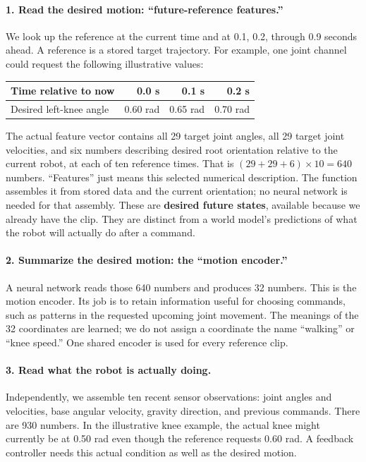 \documentclass[11pt,a4paper]{article}
\newcommand{\code}[1]{\texttt{\small\detokenize{#1}}}
\begin{document}
\paragraph{1. Read the desired motion: ``future-reference features.''}
We look up the reference at the current time and at 0.1, 0.2, through 0.9 seconds
ahead. A reference is a stored target trajectory. For example, one joint channel
could request the following illustrative values:
\begin{center}
\begin{tabular}{@{}lrrr@{}}
\toprule
Time relative to now & 0.0 s & 0.1 s & 0.2 s\\
\midrule
Desired left-knee angle & 0.60 rad & 0.65 rad & 0.70 rad\\
\bottomrule
\end{tabular}
\end{center}
The actual feature vector contains all 29 target joint angles, all 29 target
joint velocities, and six numbers describing desired root orientation relative
to the current robot, at each of ten reference times. That is
$(29+29+6)\times10=640$ numbers. ``Features'' just means this selected numerical
description. The function \code{goal()} assembles it from stored data and the
current orientation; no neural network is needed for that assembly.
These are \textbf{desired future states}, available because we already have the
clip. They are distinct from a world model's predictions of what the robot
will actually do after a command.

\paragraph{2. Summarize the desired motion: the ``motion encoder.''}
A neural network reads those 640 numbers and produces 32 numbers. This is the
motion encoder. Its job is to retain information useful for choosing commands,
such as patterns in the requested upcoming joint movement. The meanings of the
32 coordinates are learned; we do not assign a coordinate the name ``walking''
or ``knee speed.'' One shared encoder is used for every reference clip.

\paragraph{3. Read what the robot is actually doing.}
Independently, we assemble ten recent sensor observations: joint angles and
velocities, base angular velocity, gravity direction, and previous commands.
There are 930 numbers. In the illustrative knee example, the actual knee might
currently be at 0.50 rad even though the reference requests 0.60 rad. A feedback
controller needs this actual condition as well as the desired motion.
\end{document}

